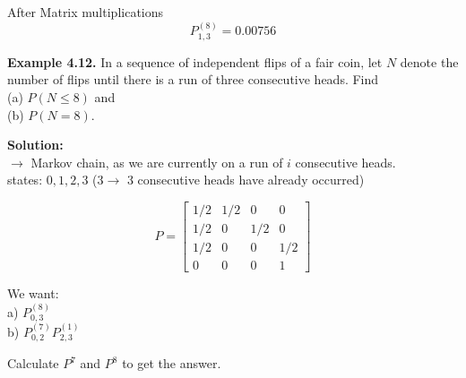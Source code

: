 \documentclass[12pt,a4paper]{article}
\begin{document}
After Matrix multiplications
\[ P_{1,3}^{(8)} = 0.00756 \]

\vspace{3em}

\textbf{Example 4.12.} In a sequence of independent flips of a fair coin, let $N$ denote the number of flips until there is a run of three consecutive heads. Find \\
(a) $P(N \leq 8)$ and \\
(b) $P(N = 8)$.

\textbf{Solution:} \\
$\rightarrow$ Markov chain, as we are currently on a run of $i$ consecutive heads. \\
states: $0, 1, 2, 3$ ($3 \rightarrow$ 3 consecutive heads have already occurred)

\[ P = \begin{bmatrix} 1/2 & 1/2 & 0 & 0 \\ 1/2 & 0 & 1/2 & 0 \\ 1/2 & 0 & 0 & 1/2 \\ 0 & 0 & 0 & 1 \end{bmatrix} \]

We want: \\
a) $P_{0,3}^{(8)}$ \\
b) $P_{0,2}^{(7)} P_{2,3}^{(1)}$

Calculate $P^7$ and $P^8$ to get the answer.
\end{document}
